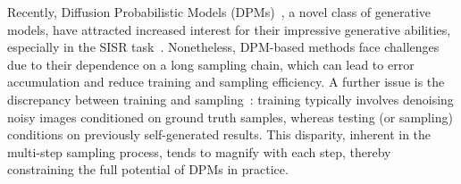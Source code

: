 \documentclass[10pt,twocolumn,letterpaper]{article}
\begin{document}
Recently, Diffusion Probabilistic Models (DPMs)~\cite{ho2020denoising,sohl2015deep}, a novel class of generative models, have attracted increased interest for their impressive generative abilities, especially in the SISR task~\cite{saharia2022image,yue2023resshift,gao2023implicit,rombach2022high,ho2022cascaded}. Nonetheless, DPM-based methods face challenges due to their dependence on a long sampling chain, which can lead to error accumulation and reduce training and sampling efficiency. A further issue is the discrepancy between training and sampling~\cite{ning2023input,yu2023debias}: training typically involves denoising noisy images conditioned on ground truth samples, whereas testing (or sampling) conditions on previously self-generated results.  This disparity, inherent in the multi-step sampling process, tends to magnify with each step, thereby constraining the full potential of DPMs in practice. 
\end{document}
